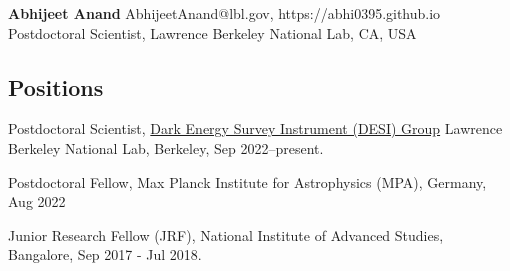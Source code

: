 \documentclass[12pt,letterpaper]{article}
\begin{document}
\thispagestyle{empty}\sloppy\sloppypar\raggedbottom

\textbf{\Large Abhijeet Anand} \hfill
\textsf{\small AbhijeetAnand@lbl.gov, https://abhi0395.github.io} \\[0.5ex]
Postdoctoral Scientist, Lawrence Berkeley National Lab, CA, USA\\[0.5ex]

\subsection{Positions}
\begin{list}{}{\cvlist}
  \item
      Postdoctoral Scientist, \href{https://www.desi.lbl.gov/}{Dark Energy Survey Instrument (DESI) Group} Lawrence Berkeley National Lab, Berkeley, Sep 2022--present.
  \item
        Postdoctoral Fellow, Max Planck Institute for Astrophysics (MPA), Germany, Aug 2022
  \item
        Junior Research Fellow (JRF), National Institute of Advanced Studies, Bangalore, Sep 2017 - Jul 2018.
\end{list}
\end{document}
